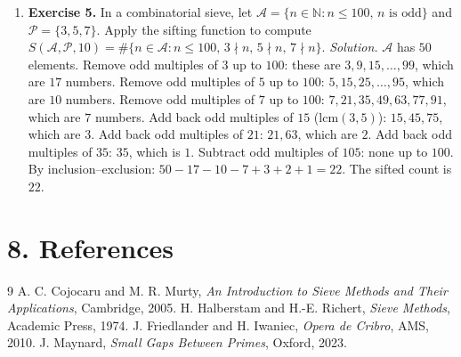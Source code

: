 \begin{enumerate}[leftmargin=*,itemsep=0.9em]
\item \textbf{Exercise 5.} In a combinatorial sieve, let $\mathcal{A}=\{n\in\mathbb{N}:n\leq 100,\,n\text{ is odd}\}$ and $\mathcal{P}=\{3,5,7\}$. Apply the sifting function to compute $S(\mathcal{A},\mathcal{P},10)=\#\{n\in\mathcal{A}:n\leq 100,\,3\nmid n,\,5\nmid n,\,7\nmid n\}$. \emph{Solution.} $\mathcal{A}$ has $50$ elements. Remove odd multiples of $3$ up to $100$: these are $3,9,15,\ldots,99$, which are $17$ numbers. Remove odd multiples of $5$ up to $100$: $5,15,25,\ldots,95$, which are $10$ numbers. Remove odd multiples of $7$ up to $100$: $7,21,35,49,63,77,91$, which are $7$ numbers. Add back odd multiples of $15$ (lcm$(3,5)$): $15,45,75$, which are $3$. Add back odd multiples of $21$: $21,63$, which are $2$. Add back odd multiples of $35$: $35$, which is $1$. Subtract odd multiples of $105$: none up to $100$. By inclusion--exclusion: $50-17-10-7+3+2+1=22$. The sifted count is $22$.

\end{enumerate}
\section*{8. References}
\begin{thebibliography}{9}
 A. C. Cojocaru and M. R. Murty, \emph{An Introduction to Sieve Methods and Their Applications}, Cambridge, 2005.
 H. Halberstam and H.-E. Richert, \emph{Sieve Methods}, Academic Press, 1974.
 J. Friedlander and H. Iwaniec, \emph{Opera de Cribro}, AMS, 2010.
 J. Maynard, \emph{Small Gaps Between Primes}, Oxford, 2023.
\end{thebibliography}
